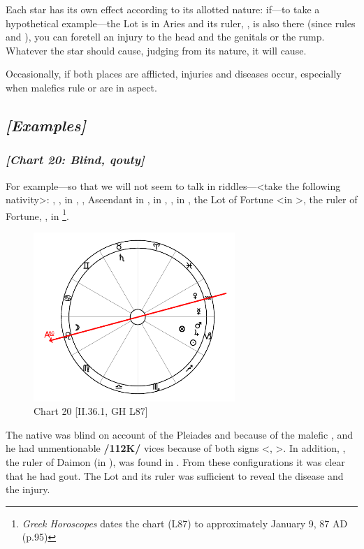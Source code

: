 Each star has its own effect according to its allotted nature: if—to take a hypothetical example—the Lot is in Aries and its ruler, \Mars, is also there (since \Mars\xspace rules \Aries\xspace and \Scorpio), you can foretell an injury
to the head and the genitals or the rump. Whatever the star should cause, judging from its nature, it will cause. 

Occasionally, if both places are afflicted, injuries and diseases occur, especially when malefics rule or
are in aspect. 
\newpage
\subsection{\textit{[Examples]}}
\subsubsection{\textit{[Chart 20: Blind, qouty]}}
For example—so that we will not seem to talk in riddles—<take the following nativity>: \Sun, \Jupiter,
\Mars\xspace in \Capricorn, \Moon, Ascendant in \Leo, \Saturn\xspace in \Taurus, \Venus, \Mercury\xspace in \Aquarius, the Lot of Fortune <in \Capricorn>, the ruler of Fortune, \Saturn, in \Taurus
\footnote{\textit{Greek Horoscopes} dates the chart (L87) to approximately January 9, 87 AD (p.95)}.

\clearpage
\begin{figure}
\centering
\vspace{-20pt}
\includegraphics[width=0.68\textwidth]{charts/2_36_1}
\caption{Chart 20 [II.36.1, GH L87]}
\label{fig:chart20}
\end{figure}

The native was blind on account of the Pleiades and because of the malefic \Saturn, and he had unmentionable \textbf{/112K/} vices because of both signs <\Capricorn, \Taurus>. In addition, \Jupiter, the ruler of Daimon (in \Pisces), was found in \Capricorn. From these configurations it was clear that he had gout. The Lot and its ruler was sufficient to reveal the disease and the injury.
\newpage

